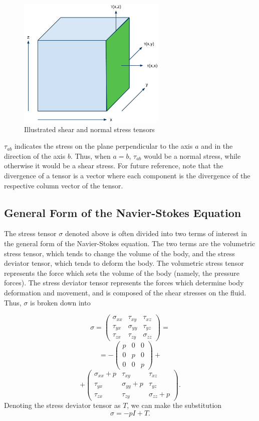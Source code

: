 \documentclass[a4paper,twocolumn]{article}
\begin{document}
\begin{figure}[htb]
    \centering
    \includegraphics[width=200pt]{Stresses.pdf}
    \caption{Illustrated shear and normal stress tensors}
\end{figure}

$\tau_{ab}$ indicates the stress on the plane perpendicular to the axis $a$ and in the direction of the axis $b$. Thus, when $a=b$, $\tau_{ab}$ would be a normal stress, while otherwise it would be a shear stress. For future reference, note that the divergence of a tensor is a vector where each component is the divergence of the respective column vector of the tensor.

\subsection{General Form of the Navier-Stokes Equation}

The stress tensor $\sigma$ denoted above is often divided into two terms of interest in the general form of the Navier-Stokes equation. The two terms are the volumetric stress tensor, which tends to change the volume of the body, and the stress deviator tensor, which tends to deform the body. The volumetric stress tensor represents the force which sets the volume of the body (namely, the pressure forces). The stress deviator tensor represents the forces which determine body deformation and movement, and is composed of the shear stresses on the fluid. Thus, $\sigma$ is broken down into

\[\sigma =  \left( \begin{array}{ccc}
    \sigma_{xx} &  \tau_{xy} & \tau_{xz} \\
\tau_{yx} &  \sigma_{yy} & \tau_{yz} \\
\tau_{zx} &  \tau_{zy} & \sigma_{zz}
\end{array} \right) = \] \[ = -\left( \begin{array}{ccc}
    p &  0 & 0 \\
0 &  p & 0 \\
0 &  0 & p 
\end{array} \right) +\]\[+ \left( \begin{array}{ccc}
    \sigma_{xx} + p &  \tau_{xy} & \tau_{xz} \\
\tau_{yx} &  \sigma_{yy} + p & \tau_{yz} \\
\tau_{zx} &  \tau_{zy} & \sigma_{zz} + p
\end{array} \right).\]
Denoting the stress deviator tensor as $T$, we can make the substitution
\[\sigma = -pI + T.\]\\
\end{document}
